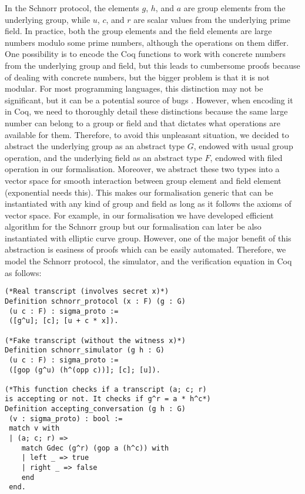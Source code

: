 \documentclass[conference,compsoc]{IEEEtran}
\begin{document}
In the Schnorr protocol, the elements $g$, $h$, and $a$ are group elements from the underlying group, while $u$, $c$, and $r$
are scalar values from the underlying prime field. In practice, both the group elements and the field elements are large 
numbers modulo some prime numbers, although the operations on them differ. 
One possibility is to encode the Coq functions to work with concrete numbers from the underlying group and field, 
but this leads to cumbersome proofs because of dealing with concrete numbers, but the bigger problem 
is that it is not modular. For most programming languages, this distinction 
may not be significant, but it can be a potential source of bugs \cite{10.1007/978-3-662-63958-0_24}. 
However, when encoding it in Coq, we need to thoroughly detail these distinctions because 
the same large number can belong to a group or field and that dictates what operations are available for them. 
Therefore, to avoid this unpleasant situation,  
we decided to abstract the underlying group as an abstract type $G$, endowed with 
usual group operation, and the underlying field as an abstract type $F$, endowed with 
filed operation in our formalisation. Moreover, we abstract these two types into a vector space for smooth interaction between 
group element and field element (exponential needs this). This 
makes our formalisation generic that can be instantiated with 
any kind of group and field as long as it follows the axioms of 
vector space. For example, in our formalisation we have developed 
efficient algorithm for the Schnorr group but our formalisation can 
later be also instantiated with elliptic curve group. However, 
one of the major benefit of this abstraction is easiness of proofs 
which can be easily automated. Therefore, we model the Schnorr 
protocol, the simulator, and the verification equation in Coq as follows: 
 
\begin{lstlisting}[frame=single, language=Coq, caption={Schnorr protocol},
  label={ind_nat},captionpos=t, basicstyle=\ttfamily\footnotesize,
  abovecaptionskip=-\medskipamount]
(*Real transcript (involves secret x)*)
Definition schnorr_protocol (x : F) (g : G) 
 (u c : F) : sigma_proto :=  
 ([g^u]; [c]; [u + c * x]).

(*Fake transcript (without the witness x)*)
Definition schnorr_simulator (g h : G) 
 (u c : F) : sigma_proto := 
 ([gop (g^u) (h^(opp c))]; [c]; [u]).

(*This function checks if a transcript (a; c; r) 
is accepting or not. It checks if g^r = a * h^c*)
Definition accepting_conversation (g h : G) 
 (v : sigma_proto) : bool :=
 match v with
 | (a; c; r) =>  
    match Gdec (g^r) (gop a (h^c)) with 
    | left _ => true
    | right _ => false 
    end
 end.
\end{lstlisting}
  
\end{document}
